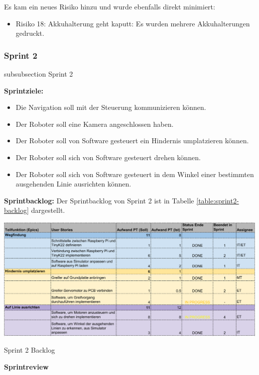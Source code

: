 Es kam ein neues Risiko hinzu und wurde ebenfalls direkt minimiert:
\begin{itemize}
    \item Risiko 18: Akkuhalterung geht kaputt: Es wurden mehrere Akkuhalterungen gedruckt.
\end{itemize}


\newpage



\subsubsection*{Sprint 2}
    {subsubsection}
    {Sprint 2}
    
\textbf{Sprintziele:}
\begin{itemize}
    \item Die Navigation soll mit der Steuerung kommunizieren können.
    \item Der Roboter soll eine Kamera angeschlossen haben.
    \item Der Roboter soll von Software gesteuert ein Hindernis umplatzieren können.
    \item Der Roboter soll sich von Software gesteuert drehen können.
    \item Der Roboter soll sich von Software gesteuert in dem Winkel einer bestimmten ausgehenden Linie ausrichten können.
\end{itemize}

\textbf{Sprintbacklog:} Der Sprintbacklog von Sprint 2 ist in Tabelle 
\ref{table:sprint2-backlog} 
dargestellt.

\begin{table}[H]
\centering
\includegraphics[width=\textwidth]{assets/projektmanagement/sprint2-crop.pdf}
\caption{Sprint 2 Backlog}
\label{table:sprint2-backlog}
\end{table}


\textbf{Sprintreview}

